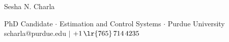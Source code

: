 \documentclass[letterpaper, 10pt]{article}
\begin{document}
\begin{center}
        \huge
        Sesha N. Charla
\end{center}
\begin{center}
        PhD Candidate $\cdot$
        Estimation and Control Systems $\cdot$
        Purdue University \\
        scharla@purdue.edu $|$
        $+1\,\lr{765}\, 714 \, 4235$
\end{center}






\end{document}
